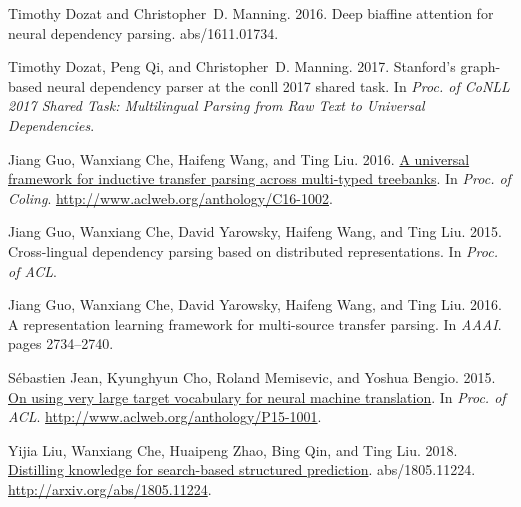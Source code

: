 \documentclass[11pt,a4paper]{article}
\begin{document}
\begin{thebibliography}{}
	Timothy Dozat and Christopher~D. Manning. 2016.
	\newblock Deep biaffine attention for neural dependency parsing.
	 abs/1611.01734.
	
	Timothy Dozat, Peng Qi, and Christopher~D. Manning. 2017.
	\newblock Stanford's graph-based neural dependency parser at the conll 2017
	shared task.
	\newblock In {\em Proc. of CoNLL 2017 Shared Task: Multilingual Parsing from
		Raw Text to Universal Dependencies\/}.
	
	Jiang Guo, Wanxiang Che, Haifeng Wang, and Ting Liu. 2016{}.
	\newblock \href{http://www.aclweb.org/anthology/C16-1002}{A universal framework
		for inductive transfer parsing across multi-typed treebanks}.
	\newblock In {\em Proc. of Coling\/}.
	\newblock
	\href{http://www.aclweb.org/anthology/C16-1002}{http://www.aclweb.org/anthology/C16-1002}.
	
	Jiang Guo, Wanxiang Che, David Yarowsky, Haifeng Wang, and Ting Liu. 2015.
	\newblock Cross-lingual dependency parsing based on distributed
	representations.
	\newblock In {\em Proc. of ACL\/}.
	
	Jiang Guo, Wanxiang Che, David Yarowsky, Haifeng Wang, and Ting Liu.
	2016{}.
	\newblock A representation learning framework for multi-source transfer
	parsing.
	\newblock In {\em AAAI\/}. pages 2734--2740.
	
	S\'{e}bastien Jean, Kyunghyun Cho, Roland Memisevic, and Yoshua Bengio. 2015.
	\newblock \href{http://www.aclweb.org/anthology/P15-1001}{On using very large
		target vocabulary for neural machine translation}.
	\newblock In {\em Proc. of ACL\/}.
	\newblock
	\href{http://www.aclweb.org/anthology/P15-1001}{http://www.aclweb.org/anthology/P15-1001}.
	
	Yijia Liu, Wanxiang Che, Huaipeng Zhao, Bing Qin, and Ting Liu.
	2018{}.
	\newblock \href{http://arxiv.org/abs/1805.11224}{Distilling knowledge for
		search-based structured prediction}.
	 abs/1805.11224.
	\newblock
	\href{http://arxiv.org/abs/1805.11224}{http://arxiv.org/abs/1805.11224}.
	

\end{thebibliography}
\end{document}
